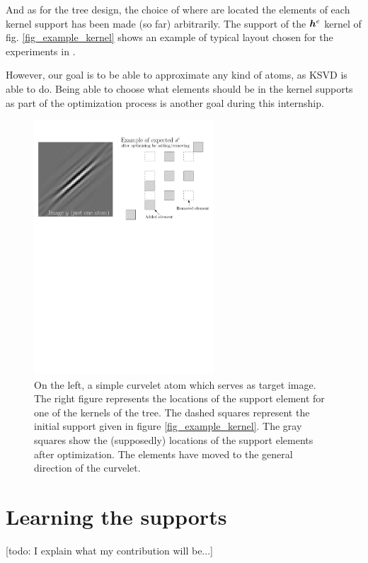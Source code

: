 And as for the tree design, the choice of where are located the elements of each kernel support has been made (so far) arbitrarily. The support of the $\bm{h}^e$ kernel of fig. \ref{fig_example_kernel} shows an example of typical layout chosen for the experiments in \cite{chabiron_optimization_2016}. 

However, our goal is to be able to approximate any kind of atoms, as \ac{KSVD} is able to do. Being able to choose what elements should be in the kernel supports as part of the optimization process is another goal during this internship.

\begin{figure}[!ht] \centering
\includegraphics[width=0.6\textwidth]{figures/add-rm-elmts-support.pdf}
\caption{On the left, a simple curvelet atom which serves as target image. The right figure represents the locations of the support element for one of the kernels of the tree. The dashed squares represent the initial support given in figure \ref{fig_example_kernel}. The gray squares show the (supposedly) locations of the support elements after optimization. The elements have moved to the general direction of the curvelet.\label{fig_example_optimal_support}}
\end{figure}

\section{Learning the supports}
[todo: I explain what my contribution will be...]



